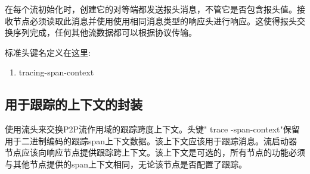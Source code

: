 在每个流初始化时，创建它的对等端都发送报头消息，不管它是否包含报头值。接收节点必须读取此消息并使用使用相同消息类型的响应头进行响应。这使得报头交换序列完成，任何其他流数据都可以根据协议传输。

标准头键名定义在这里:

\begin{enumerate}
\item tracing-span-context
\end{enumerate}


\subsection{用于跟踪的上下文的封装\statusgreen}

使用流头来交换P2P流作用域的跟踪跨度上下文。头键" trace -span-context"保留用于二进制编码的跟踪span上下文数据。该上下文应该用于跟踪消息。流启动器节点应该向响应节点提供跟踪跨上下文。该上下文是可选的，所有节点的功能必须与其他节点提供的span上下文相同，无论该节点是否配置了跟踪。
